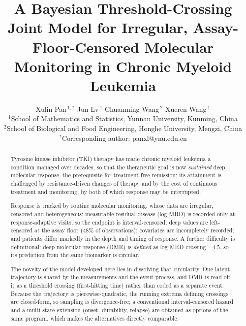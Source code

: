 \documentclass[11pt]{article}
\title{A Bayesian Threshold-Crossing Joint Model for Irregular,
Assay-Floor-Censored Molecular Monitoring in Chronic Myeloid Leukemia}
\author{
  Xulin Pan\,$^{1,\ast}$ \quad Jun Lv\,$^{1}$ \quad Chuanming Wang\,$^{2}$ \quad
  Xueren Wang\,$^{1}$ \\[6pt]
  \small $^{1}$School of Mathematics and Statistics, Yunnan University, Kunming, China\\
  \small $^{2}$School of Biological and Food Engineering, Honghe University, Mengzi, China\\
  \small $^{\ast}$Corresponding author: panxl@ynu.edu.cn
}
\date{}
\begin{document}
\maketitle

\begin{abstract}
Tyrosine kinase inhibitor (TKI) therapy has made chronic myeloid leukemia a
condition managed over decades, so that the therapeutic goal is now
\emph{sustained} deep molecular response, the prerequisite for treatment-free
remission; its attainment is challenged by resistance-driven changes of therapy
and by the cost of continuous treatment and monitoring, by both of which
response may be interrupted.

Response is tracked by routine molecular monitoring, whose data are irregular,
censored and heterogeneous: measurable residual disease (log-MRD) is recorded
only at response-adaptive visits, so the endpoint is interval-censored; deep
values are left-censored at the assay floor ($48\%$ of observations); covariates
are incompletely recorded; and patients differ markedly in the depth and timing
of response. A further difficulty is definitional: deep molecular response (DMR)
is \emph{defined} as log-MRD crossing $-4.5$, so its prediction from the same
biomarker is circular.

The novelty of the model developed here lies in dissolving that circularity. One
latent trajectory is shared by the measurements and the event process, and DMR
is read off it as a threshold crossing (first-hitting time) rather than coded as
a separate event. Because the trajectory is piecewise-quadratic, the running
extrema defining crossings are closed-form, so sampling is divergence-free; a
conventional interval-censored hazard and a multi-state extension (onset,
durability, relapse) are obtained as options of the same program, which makes
the alternatives directly comparable.


\end{abstract}
\end{document}
